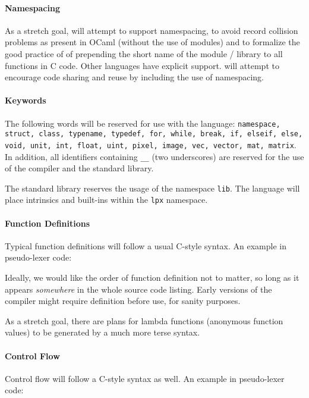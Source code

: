 \paragraph{Namespacing}
As a stretch goal, \lepix{} will attempt to support namespacing, to avoid record collision problems as present in OCaml (without the use of modules) and to formalize the good practice of of prepending the short name of the module / library to all functions in C code. Other languages have explicit support. \lepix{} will attempt to encourage code sharing and reuse by including the use of namespacing.

\paragraph{Keywords}
The following words will be reserved for use with the language: \lstinline|namespace, struct, class, typename, typedef, for, while, break, if, elseif, else, void, unit, int, float, uint, pixel, image, vec, vector, mat, matrix|. In addition, all identifiers containing \verb|__| (two underscores) are reserved for the use of the compiler and the standard library.

The standard library reserves the usage of the namespace \lstinline|lib|. The language will place intrinsics and built-ins within the \lstinline|lpx| namespace.

\paragraph{Function Definitions}
\label{par:function-definitions}
Typical function definitions will follow a usual C-style syntax. An example in pseudo-lexer code:


Ideally, we would like the order of function definition not to matter, so long as it appears \emph{somewhere} in the whole source code listing. Early versions of the \lepix{} compiler might require definition before use, for sanity purposes.

As a stretch goal, there are plans for lambda functions (anonymous function values) to be generated by a much more terse syntax.

\paragraph{Control Flow}
Control flow will follow a C-style syntax as well. An example in pseudo-lexer code:


